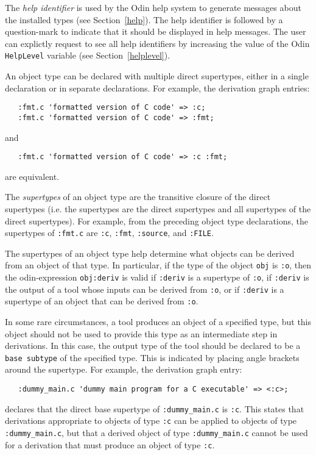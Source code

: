 \documentclass[hidelinks]{report}
\newcommand{\ex}{\tt}   %
\begin{document}
The {\em help identifier} is used by the Odin help system to generate
messages about the installed types (see Section~\ref{help}).
The help identifier is followed by a question-mark to indicate that
it should be displayed in help messages.
The user can explictly request to see all help identifiers
by increasing the value of the Odin {\ex HelpLevel} variable
(see Section~\ref{helplevel}).

An object type can be declared with multiple direct supertypes,
either in a single declaration or in separate declarations.
For example, the derivation graph entries:
\begin{verbatim}
   :fmt.c 'formatted version of C code' => :c;
   :fmt.c 'formatted version of C code' => :fmt;
\end{verbatim}
and
\begin{verbatim}
   :fmt.c 'formatted version of C code' => :c :fmt;
\end{verbatim}
are equivalent.

The {\em supertypes} of an object type are
the transitive closure of the direct supertypes
(i.e. the supertypes are the direct supertypes
and all supertypes of the direct supertypes).
For example, from the preceding object type declarations,
the supertypes of {\ex :fmt.c} are {\ex :c}, {\ex :fmt},
{\ex :source}, and {\ex :FILE}.

The supertypes of an object type help determine what objects
can be derived from an object of that type.
In particular, if the type of the object {\ex obj} is {\ex :o},
then the odin-expression {\ex obj:deriv} is valid
if {\ex :deriv} is a supertype of {\ex :o},
if {\ex :deriv} is the output of a tool
whose inputs can be derived from {\ex :o},
or if {\ex :deriv} is a supertype of an object
that can be derived from {\ex :o}.

In some rare circumstances, a tool produces an object of a specified type,
but this object should not be used to provide this type as an intermediate
step in derivations.
In this case, the output type of the tool should be declared to be
a {\ex base subtype} of the specified type.
This is indicated by placing angle brackets around the supertype.
For example, the derivation graph entry:
\begin{verbatim}
   :dummy_main.c 'dummy main program for a C executable' => <:c>;
\end{verbatim}
declares that the direct base supertype of {\ex :dummy\_main.c} is {\ex :c}.
This states that derivations appropriate to objects of type
{\ex :c} can be applied to objects of type {\ex :dummy\_main.c},
but that a derived object of type {\ex :dummy\_main.c} cannot be used
for a derivation that must produce an object of type {\ex :c}.
\end{document}
